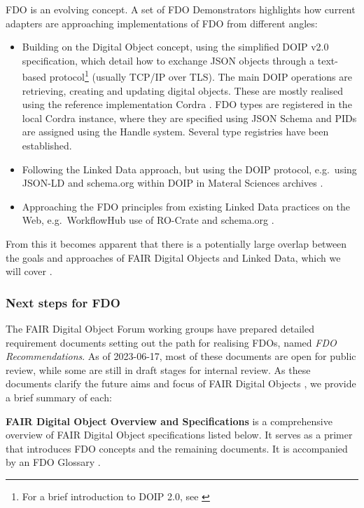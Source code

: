 FDO is an evolving concept. A set of FDO Demonstrators \cite{wittenburgFAIRDigitalObject2022b} highlights how current adapters are approaching implementations of FDO from different angles:

\begin{itemize}
\tightlist
\item
  Building on the Digital Object concept, using the simplified DOIP v2.0 \cite{DONA 2018} specification, which detail how to exchange JSON objects through a text-based protocol\footnote{For a brief introduction to DOIP 2.0, see \cite{DOIPExamplesCordraa}} (usually TCP/IP over TLS). The main DOIP operations are retrieving, creating and updating digital objects. These are mostly realised using the reference implementation Cordra \cite{tupelo-schneckrobertBriefIntroductionCordra2022}. FDO types are registered in the local Cordra instance, where they are specified using JSON Schema \cite{Draftbhuttonjsonschema} and PIDs are assigned using the Handle system. Several type registries have been established.
\item
  Following the Linked Data approach, but using the DOIP protocol, e.g.~using JSON-LD and schema.org within DOIP in Materal Sciences archives \cite{10.1002/jcc.26842}.
\item
  Approaching the FDO principles from existing Linked Data practices on the Web, e.g.~WorkflowHub use of RO-Crate and schema.org \cite{10.3897/rio.8.e93937}.
\end{itemize}

From this it becomes apparent that there is a potentially large overlap between the goals and approaches of FAIR Digital Objects and Linked Data, which we will cover .


\subsubsection{Next steps for FDO}\label{ch3:next-step-fdo}

The FAIR Digital Object Forum \cite{FAIRDigitalObjects} working groups have prepared detailed requirement documents \cite{fdo-Specs} setting out the path for realising FDOs, named \emph{FDO Recommendations}. As of 2023-06-17, most of these documents are open for public review, while some are still in draft stages for internal review. As these documents clarify the future aims and focus of FAIR Digital Objects \cite{fdo-Roadmap}, we provide a brief summary of each:

\textbf{FAIR Digital Object Overview and Specifications} \cite{fdo-Overview} is a comprehensive overview of FAIR Digital Object specifications listed below. It serves as a primer that introduces FDO concepts and the remaining documents. It is accompanied by an FDO Glossary \cite{fdo-Glossary}.

